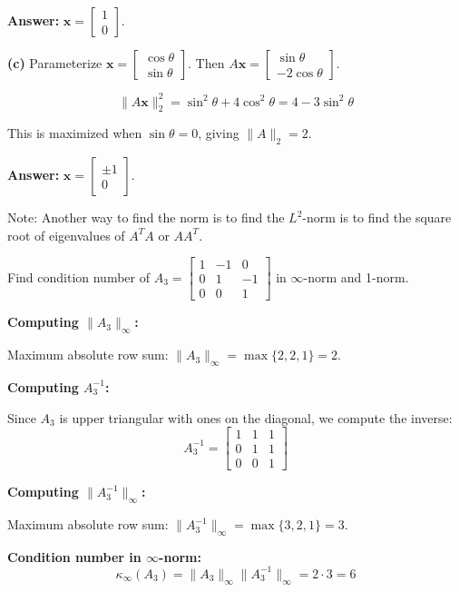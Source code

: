 \documentclass[reqno, answers]{exam}
\begin{document}
\begin{questions}
\begin{solution}
\textbf{Answer:} $\mathbf{x} = \begin{bmatrix} 1 \\ 0 \end{bmatrix}$.

\textbf{(c)} Parameterize $\mathbf{x} = \begin{bmatrix} \cos\theta \\ \sin\theta \end{bmatrix}$. Then $A\mathbf{x} = \begin{bmatrix} \sin\theta \\ -2\cos\theta \end{bmatrix}$.

\[
\|A\mathbf{x}\|_2^2 = \sin^2\theta + 4\cos^2\theta = 4 - 3\sin^2\theta
\]

This is maximized when $\sin\theta = 0$, giving $\|A\|_2 = 2$.

\textbf{Answer:} $\mathbf{x} = \begin{bmatrix} \pm 1 \\ 0 \end{bmatrix}$.

Note: Another way to find the norm is to find the $L^2$-norm is to find the square root of eigenvalues of $A^T A$ or $A A^T$.
\end{solution}

\newpage 
\question Find condition number of $A_3 = \begin{bmatrix} 1 & -1 & 0 \\ 0 & 1 & -1 \\ 0 & 0 & 1 \end{bmatrix}$ in $\infty$-norm and 1-norm.

\begin{solution}
\textbf{Computing $\|A_3\|_\infty$:}

Maximum absolute row sum: $\|A_3\|_\infty = \max\{2, 2, 1\} = 2$.

\textbf{Computing $A_3^{-1}$:}

Since $A_3$ is upper triangular with ones on the diagonal, we compute the inverse:
\[
A_3^{-1} = \begin{bmatrix} 1 & 1 & 1 \\ 0 & 1 & 1 \\ 0 & 0 & 1 \end{bmatrix}
\]

\textbf{Computing $\|A_3^{-1}\|_\infty$:}

Maximum absolute row sum: $\|A_3^{-1}\|_\infty = \max\{3, 2, 1\} = 3$.

\textbf{Condition number in $\infty$-norm:}
\[
\kappa_\infty(A_3) = \|A_3\|_\infty \|A_3^{-1}\|_\infty = 2 \cdot 3 = 6
\]


\end{solution}
\end{questions}
\end{document}
